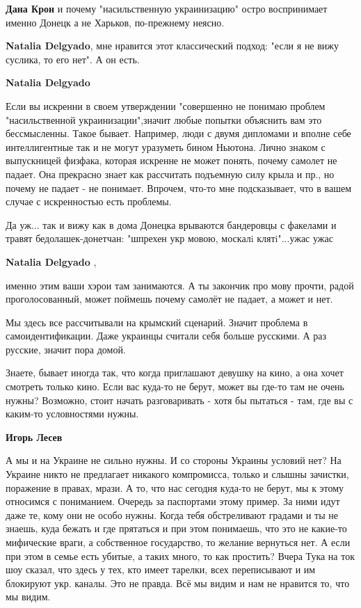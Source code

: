 \begin{itemize}
\begin{itemize}
\textbf{Дана Крон} и почему "насильственную украинизацию" остро воспринимает именно Донецк а не Харьков, по-прежнему неясно.

\textbf{Natalia Delgyado}, мне нравится этот классический подход: "если я не вижу суслика, то его нет". А он есть.

\textbf{Natalia Delgyado} 

Если вы искренни в своем утверждении "совершенно не понимаю проблем
"насильственной украинизации",значит любые попытки объяснить вам это
бессмысленны. Такое бывает. Например, люди с двумя дипломами и вполне себе
интеллигентные так и не могут уразуметь бином Ньютона. Лично знаком с
выпускницей физфака, которая искренне не может понять, почему самолет не падает.
Она прекрасно знает как рассчитать подъемную силу крыла и пр., но почему не
падает - не понимает. Впрочем, что-то мне подсказывает, что в вашем случае с
искренностью есть проблемы.


Да уж... так и вижу как в дома Донецка врываются бандеровцы с факелами и травят
бедолашек-донетчан: "шпрехен укр мовою, москалi клятi"...ужас ужас

\textbf{Natalia Delgyado} , 

именно этим ваши хэрои там занимаются. А ты закончик про мову прочти, радой
проголосованный, может поймешь почему самолёт не падает, а может и нет.

\end{itemize} %


Мы здесь все рассчитывали на крымский сценарий. Значит проблема в
самоидентификации. Даже украинцы считали себя больше русскими. А раз
русские, значит пора домой.

\begin{itemize} %

Знаете, бывает иногда так, что когда приглашают девушку на кино, а она хочет
смотреть только кино. Если вас куда-то не берут, может вы где-то там не очень
нужны? Возможно, стоит начать разговаривать - хотя бы пытаться - там, где вы с
каким-то условностями нужны.

\textbf{Игорь Лесев} 

А мы и на Украине не сильно нужны. И со стороны Украины условий нет? На Украине
никто не предлагает никакого компромисса, только и слышны зачистки, поражение в
правах, мрази. А то, что нас сегодня куда-то не берут, мы к этому относимся с
пониманием. Очередь за паспортами этому пример. За ними идут даже те, кому они
не особо нужны. Когда тебя обстреливают градами и ты не знаешь, куда бежать и
где прятаться и при этом понимаешь, что это не какие-то мифические враги, а
собственное государство, то желание вернуться нет. А если при этом в семье есть
убитые, а таких много, то как простить? Вчера Тука на ток шоу сказал, что здесь у
тех, кто имеет тарелки, всех переписывают и им блокируют укр. каналы. Это не
правда. Всё мы видим и нам не нравится то, что мы видим.


\end{itemize}
\end{itemize}
